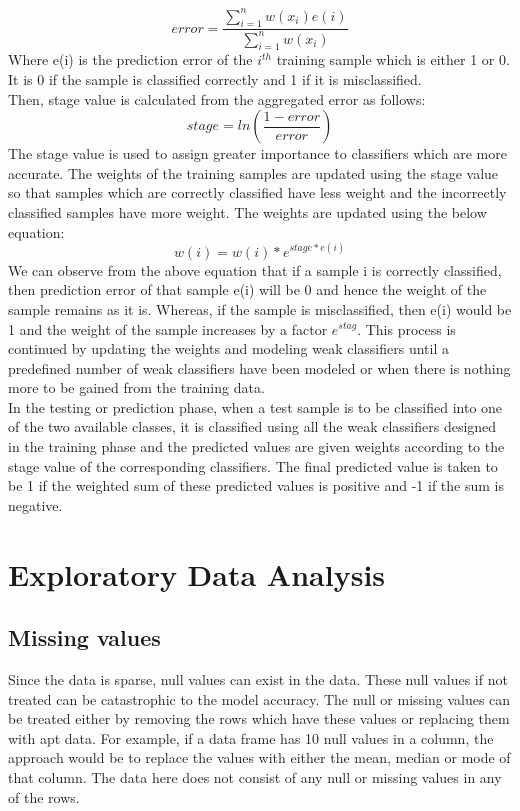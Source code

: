 \documentclass[sigconf]{acmart}
\begin{document}
\begin{equation}
    error = \frac{\sum_{i=1}^{n}w(x_i)e(i)}{\sum_{i=1}^{n}w(x_i)}
\end{equation}
Where e(i) is the prediction error of the $i^{th}$ training sample which is either 1 or 0. It is 0 if the sample is classified correctly and 1 if it is misclassified. \\
Then, stage value is calculated from the aggregated error as follows\cite{Brownlee2016}:
\begin{equation}
    stage = ln(\frac{1-error}{error})
\end{equation}
The stage value is used to assign greater importance to classifiers which are more accurate. The weights of the training samples are updated using the stage value so that samples which are correctly classified have less weight and the incorrectly classified samples have more weight. The weights are updated using the below equation\cite{Brownlee2016}:
\begin{equation}
    w(i) = w(i)*e^{stage*e(i)}
\end{equation}
We can observe from the above equation that if a sample i is correctly classified, then prediction error of that sample e(i) will be 0 and hence the weight of the sample remains as it is. Whereas, if the sample is misclassified, then e(i) would be 1 and the weight of the sample increases by a factor $e^{stag}$. This process is continued by updating the weights and modeling weak classifiers until a predefined number of weak classifiers have been modeled or when there is nothing more to be gained from the training data.\cite{Brownlee2016}\\
In the testing or prediction phase, when a test sample is to be classified into one of the two available classes, it is classified using all the weak classifiers designed in the training phase and the predicted values are given weights according to the stage value of the corresponding classifiers\cite{Brownlee2016}. The final predicted value is taken to be 1 if the weighted sum of these predicted values is positive and -1  if the sum is negative.

\section{Exploratory Data Analysis}
\subsection{Missing values}
Since the data is sparse, null values can exist in the data. These null values if not treated can be catastrophic to the model accuracy. The null or missing values can be treated either by removing the rows which have these values or replacing them with apt data. For example, if a data frame has 10 null values in a column, the approach would be to replace the values with either the mean, median or mode of that column.  The data here does not consist of any null or missing values in any of the rows.
\end{document}
